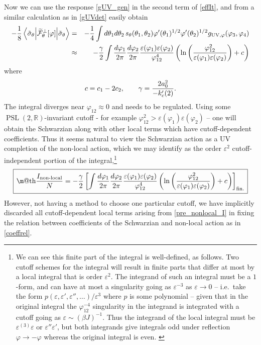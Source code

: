 \documentclass[12pt]{article}
\makeatletter
\newcommand*{\wideboxed}[1]{\setlength{\fboxsep}{1ex}%
  \fbox{\m@th$\displaystyle#1$}}
\newcommand{\calF}{\mathcal{F}}
\newcommand{\RR}{\mathbb{R}}
\DeclareMathOperator{\PSL}{PSL}
\newcommand{\nloc}{\text{non-local}}
\newcommand{\UV}{\text{UV}}
\newcommand{\tF}{\widetilde{\calF}}
\newcommand{\tsig}{\tilde{\sigma}}
\newcommand{\tht}{\theta}
\newcommand{\ga}{\gamma}
\newcommand{\vep}{\varepsilon}
\newcommand{\vp}{\varphi}
\newcommand{\be}{\begin{equation}}
\newcommand{\ee}{\end{equation}}
\newcommand{\bea}{\begin{eqnarray}}
\newcommand{\eea}{\end{eqnarray}}
\newcommand{\nn}{\nonumber\\}
\def\ie{i.e.\ }
\newcommand{\ov}{\over}
\makeatother
\begin{document}
Now we can use the response \eqref{gUV_gen} in the second term of \eqref{effIt}, and from a similar calculation as in \eqref{gUVdet} easily obtain
\bea \label{pre_nonlocal_I}
-{1 \ov 8}\mel**{\tsig_{\tht} }{ \tF_\tht^{\perp}[\vp]}{\tsig_{\tht}}&=&-{1 \ov 4}\int d\tht_1 d\tht_2\, s_{\tht}(\tht_1, \tht_2)\vp'(\tht_1)^{1/2}\vp'(\tht_2)^{1/2}g_{\UV, \vp}(\vp_3, \vp_4)\nn
&\approx &-{\ga \ov 2}\int {d\vp_1 \ov 2 \pi}{d\vp_2 \ov 2\pi}{\vep(\vp_1)\vep(\vp_2) \ov \vp_{12}^4}\left( \ln \left({\vp_{12}^2 \ov \vep(\vp_1)\vep(\vp_2)}\right) + c \right)
\eea
where
\be \label{coeffrel}
c=c_1-2c_2, \qquad  \gamma={2 a_0^2 \ov -k_c'(2)}.
 \ee
The integral diverges near $\vp_{12} \approx 0$ and needs to be regulated. Using some $\PSL(2, \RR)$-invariant cutoff - for example $\vp_{12}^2 > \vep(\vp_1)\vep(\vp_2)$ -- one will obtain the Schwarzian along with other local terms which have cutoff-dependent coefficients. Thus it seems natural to view the Schwarzian action as a UV completion of the non-local action, which we may identify as the order $\vep^2$ cutoff-independent portion of the integral,\footnote{We can see this finite part of the integral is well-defined, as follows. Two cutoff schemes for the integral will result in finite parts that differ at most by a local integral that is order $\vep^2$. The integrand of such an integral must be a $1$-form, and can have at most a singularity going as $\vep^{-3}$ as $\vep \to 0$ -- \ie take the form $p(\vep, \vep', \vep'',\dots)/\vep^3$ where $p$ is some polynomial -- given that in the original integral the $\vp_{12}^{-4}$ singularity in the integrand is integrated with a cutoff going as $\vep \sim (\beta J)^{-1}$. Thus the integrand of the local integral must be $\vep^{(3)}\vep$ or $\vep'' \vep'$, but both integrands give integrals odd under reflection $ \vp \to -\vp$ whereas the original integral is even. \label{nolocarg}}
\be \label{Inlfin}
\wideboxed{{I_{\nloc} \ov N}=-{\ga \ov 2}\left[\int {d\vp_1 \ov 2 \pi}{d\vp_2 \ov 2\pi}{\vep(\vp_1)\vep(\vp_2) \ov \vp_{12}^4}\left( \ln \left({\vp_{12}^2 \ov \vep(\vp_1)\vep(\vp_2)}\right) + c \right)\right]_{\text{fin.}}}
\ee 
However, not having a method to choose one particular cutoff, we have implicitly discarded all cutoff-dependent local terms arising from \eqref{pre_nonlocal_I} in fixing the relation between coefficients of the Schwarzian and non-local action as in \eqref{coeffrel}.
\end{document}
